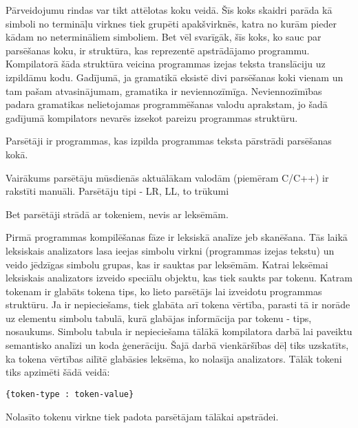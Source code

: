 Pārveidojumu rindas var tikt attēlotas koku veidā. Šīs koks skaidri parāda kā simboli no termināļu virknes tiek grupēti apakšvirknēs, katra no kurām pieder kādam no netermināliem simboliem. Bet vēl svarīgāk, šīs koks, ko sauc par parsēšanas koku, ir struktūra, kas reprezentē apstrādājamo programmu. Kompilatorā šāda struktūra veicina programmas izejas teksta translāciju uz izpildāmu kodu. Gadījumā, ja gramatikā eksistē divi parsēšanas koki vienam un tam pašam atvasinājumam, gramatika ir neviennozīmīga. Neviennozīmības padara gramatikas nelietojamas programmēšanas valodu aprakstam, jo šadā gadījumā kompilators nevarēs izsekot pareizu programmas struktūru. \cite{Hopcroft:IntroAutomataTheory}

Parsētāji ir programmas, kas izpilda programmas teksta pārstrādi parsēšanas kokā. 

Vairākums parsētāju mūsdienās aktuālākam valodām (piemēram C/C++) ir rakstīti manuāli. 
Parsētāju tipi - LR, LL, to trūkumi


Bet parsētāji strādā ar tokeniem, nevis ar leksēmām. 

Pirmā programmas kompilēšanas fāze ir leksiskā analīze jeb skanēšana. Tās laikā leksiskais analizators lasa ieejas simbolu virkni (programmas izejas tekstu) un veido jēdzīgas simbolu grupas, kas ir sauktas par leksēmām. Katrai leksēmai leksiskais analizators izveido speciālu objektu, kas tiek saukts par tokenu. Katram tokenam ir glabāts tokena tips, ko lieto parsētājs lai izveidotu programmas struktūru. Ja ir nepieciešams, tiek glabāta arī tokena vērtība, parasti tā ir norāde uz elementu simbolu tabulā, kurā glabājas informācija par tokenu - tips, nosaukums. Simbolu tabula ir nepieciešama tālākā kompilatora darbā lai paveiktu semantisko analīzi un koda ģenerāciju. Šajā darbā vienkāršības dēļ tiks uzskatīts, ka tokena vērtības ailītē glabāsies   leksēma, ko nolasīja analizators. Tālāk tokeni tiks apzimēti šādā veidā:

\begin{verbatim}
{token-type : token-value}
\end{verbatim}

Nolasīto tokenu virkne tiek padota parsētājam tālākai apstrādei.


